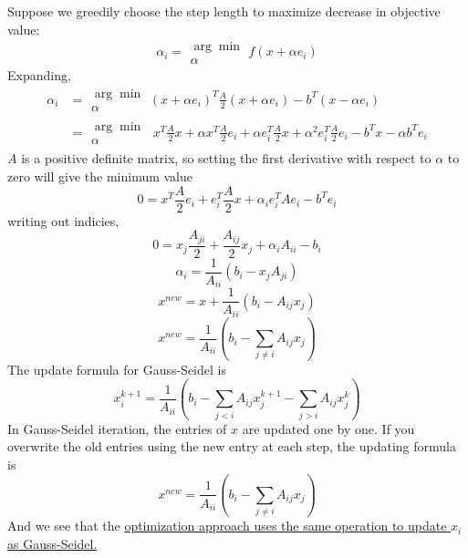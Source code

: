 \documentclass[11pt]{article} %
\begin{document}
\subsection{} %
Suppose we greedily choose the step length to maximize decrease in objective value:
\begin{equation}
\alpha_i = \substack{\arg  \min \\ \alpha} f(x+ \alpha e_i)
\end{equation}
Expanding,
\begin{equation}
\begin{split}
\alpha_i &= \substack{\arg  \min \\ \alpha}(x + \alpha e_i )^T \frac{A}{2} (x+ \alpha e_i) - b^T (x-\alpha e_i) \\
 &=\substack{\arg  \min \\ \alpha} \; x^T \frac{A}{2} x+\alpha x^T \frac{A}{2}  e_i + \alpha e_i^T \frac{A}{2} x + \alpha^2 e_i^T \frac{A}{2} e_i - b^T x-\alpha b^T e_i
\end{split}
\end{equation}
$A$ is a positive definite matrix, so setting the first derivative with respect to $\alpha$ to zero will give the minimum value
\begin{equation}
0 = x^T \frac{A}{2}  e_i +  e_i^T \frac{A}{2} x +  \alpha_i e_i^T A e_i - b^T e_i
\end{equation}
writing out indicies,
\begin{equation}
0 = x_j \frac{A_{ji}}{2} +  \frac{A_{ij}}{2} x_j +  \alpha_i A_{ii} - b_i
\end{equation}
\begin{equation}
\alpha_i = \frac{1}{A_{ii}} \left ( b_i  -x_j A_{ji}\right )
\end{equation}
\begin{equation}
x^{new} = x + \frac{1}{A_{ii}} \left (b_i  - A_{ij}x_j\right )
\end{equation}
\begin{equation}
\boxed{x^{new} =  \frac{1}{A_{ii}} \left (b_i  - \sum_{j\ne i} A_{ij}x_j\right )}
\end{equation}
The update formula for Gauss-Seidel is
\begin{equation}
x_i^{k+1} = \frac{1}{A_{ii}} \left ( b_i - \sum_{j<i} A_{ij} x_j^{k+1} - \sum_{j>i} A_{ij} x_j ^k \right )
\end{equation}
In Gauss-Seidel iteration, the entries of $x$ are updated one by one. If you overwrite the old entries using the new entry at each step, the updating formula is
 \begin{equation}
\boxed{x^{new} =  \frac{1}{A_{ii}} \left (b_i  - \sum_{j\ne i} A_{ij}x_j\right )}
\end{equation}
And we see that the \uline{optimization approach uses the same operation to update $x_i$ as Gauss-Seidel.}
\end{document}
